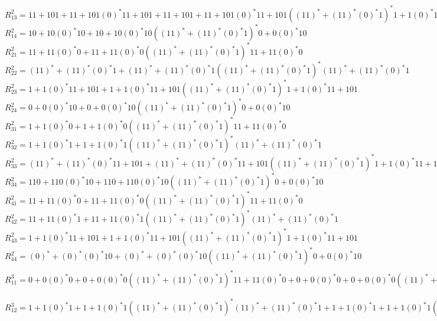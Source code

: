 \documentclass[11pt,a4paper]{report}
\begin{document}
$R_{13}^{2} = 11+101+11+101(0)^{*}11+101+11+101+11+101(0)^{*}11+101((11)^{*}+(11)^{*}(0)^{*}1)^{*}1+1(0)^{*}11+101$\\
$R_{14}^{2} = 10+10(0)^{*}10+10+10(0)^{*}10((11)^{*}+(11)^{*}(0)^{*}1)^{*}0+0(0)^{*}10$\\
$R_{21}^{2} = 11+11(0)^{*}0+11+11(0)^{*}0((11)^{*}+(11)^{*}(0)^{*}1)^{*}11+11(0)^{*}0$\\
$R_{22}^{2} = (11)^{*}+(11)^{*}(0)^{*}1+(11)^{*}+(11)^{*}(0)^{*}1((11)^{*}+(11)^{*}(0)^{*}1)^{*}(11)^{*}+(11)^{*}(0)^{*}1$\\
$R_{23}^{2} = 1+1(0)^{*}11+101+1+1(0)^{*}11+101((11)^{*}+(11)^{*}(0)^{*}1)^{*}1+1(0)^{*}11+101$\\
$R_{24}^{2} = 0+0(0)^{*}10+0+0(0)^{*}10((11)^{*}+(11)^{*}(0)^{*}1)^{*}0+0(0)^{*}10$\\
$R_{31}^{2} = 1+1(0)^{*}0+1+1(0)^{*}0((11)^{*}+(11)^{*}(0)^{*}1)^{*}11+11(0)^{*}0$\\
$R_{32}^{2} = 1+1(0)^{*}1+1+1(0)^{*}1((11)^{*}+(11)^{*}(0)^{*}1)^{*}(11)^{*}+(11)^{*}(0)^{*}1$\\
$R_{33}^{2} = (11)^{*}+(11)^{*}(0)^{*}11+101+(11)^{*}+(11)^{*}(0)^{*}11+101((11)^{*}+(11)^{*}(0)^{*}1)^{*}1+1(0)^{*}11+101$\\
$R_{34}^{2} = 110+110(0)^{*}10+110+110(0)^{*}10((11)^{*}+(11)^{*}(0)^{*}1)^{*}0+0(0)^{*}10$\\
$R_{41}^{2} = 11+11(0)^{*}0+11+11(0)^{*}0((11)^{*}+(11)^{*}(0)^{*}1)^{*}11+11(0)^{*}0$\\
$R_{42}^{2} = 11+11(0)^{*}1+11+11(0)^{*}1((11)^{*}+(11)^{*}(0)^{*}1)^{*}(11)^{*}+(11)^{*}(0)^{*}1$\\
$R_{43}^{2} = 1+1(0)^{*}11+101+1+1(0)^{*}11+101((11)^{*}+(11)^{*}(0)^{*}1)^{*}1+1(0)^{*}11+101$\\
$R_{44}^{2} = (0)^{*}+(0)^{*}(0)^{*}10+(0)^{*}+(0)^{*}(0)^{*}10((11)^{*}+(11)^{*}(0)^{*}1)^{*}0+0(0)^{*}10$\\
$R_{11}^{3} = 0+0(0)^{*}0+0+0(0)^{*}0((11)^{*}+(11)^{*}(0)^{*}1)^{*}11+11(0)^{*}0+0+0(0)^{*}0+0+0(0)^{*}0((11)^{*}+(11)^{*}(0)^{*}1)^{*}11+11(0)^{*}0((11)^{*}+(11)^{*}(0)^{*}11+101+(11)^{*}+(11)^{*}(0)^{*}11+101((11)^{*}+(11)^{*}(0)^{*}1)^{*}1+1(0)^{*}11+101)^{*}1+1(0)^{*}0+1+1(0)^{*}0((11)^{*}+(11)^{*}(0)^{*}1)^{*}11+11(0)^{*}0$\\
$R_{12}^{3} = 1+1(0)^{*}1+1+1(0)^{*}1((11)^{*}+(11)^{*}(0)^{*}1)^{*}(11)^{*}+(11)^{*}(0)^{*}1+1+1(0)^{*}1+1+1(0)^{*}1((11)^{*}+(11)^{*}(0)^{*}1)^{*}(11)^{*}+(11)^{*}(0)^{*}1((11)^{*}+(11)^{*}(0)^{*}11+101+(11)^{*}+(11)^{*}(0)^{*}11+101((11)^{*}+(11)^{*}(0)^{*}1)^{*}1+1(0)^{*}11+101)^{*}1+1(0)^{*}1+1+1(0)^{*}1((11)^{*}+(11)^{*}(0)^{*}1)^{*}(11)^{*}+(11)^{*}(0)^{*}1$\\
\end{document}
